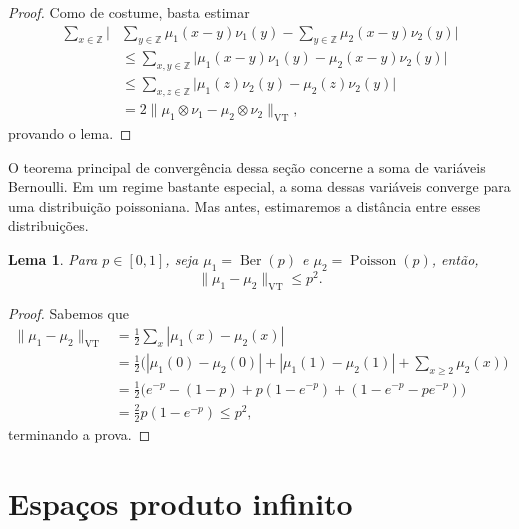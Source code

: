 \documentclass[reqno, draft]{book}
\newcommand*\1{\mathds{1}}
\newtheorem{lemma}[theorem]{Lema}
\DeclareMathOperator{\Poisson}{Poisson}
\DeclareMathOperator{\Ber}{Ber}
\DeclareMathOperator{\VT}{VT}
\begin{document}
\begin{proof}
Como de costume, basta estimar
\begin{equation}
  \begin{split}
    \sum_{x \in \mathbb{Z}} \Big| & \sum_{y \in \mathbb{Z}} \mu_1(x-y) \nu_1(y) - \sum_{y \in \mathbb{Z}} \mu_2(x-y)\nu_2(y) \Big|\\
    & \leq \sum_{x, y \in \mathbb{Z}} \big| \mu_1(x-y) \nu_1(y) - \mu_2(x-y)\nu_2(y) \big|\\
    & \leq \sum_{x, z \in \mathbb{Z}} \big| \mu_1(z) \nu_2(y) - \mu_2(z)\nu_2(y) \big|\\
    & = 2\lVert \mu_1 \otimes \nu_1 - \mu_2 \otimes \nu_2 \rVert_{\VT},
  \end{split}
\end{equation}
provando o lema.
\end{proof}

O teorema principal de convergência dessa seção concerne a soma de variáveis Bernoulli. Em um regime bastante especial, a soma dessas variáveis converge para uma distribuição poissoniana. Mas antes, estimaremos a distância entre esses distribuições.

\begin{lemma}
\label{l:vt_ber_poiss}
Para $p \in [0,1]$, seja $\mu_1 = \Ber(p)$ e $\mu_2 = \Poisson(p)$, então,
\begin{equation}
  \lVert \mu_1 - \mu_2 \rVert_{\VT} \leq p^2.
\end{equation}
\end{lemma}

\begin{proof}
Sabemos que
\begin{equation}
  \begin{split}
    \lVert \mu_1 - \mu_2 \rVert_{\VT} & = \frac{1}{2} \sum_{x} |\mu_1(x) - \mu_2(x)|\\
    & = \frac{1}{2} \Big( |\mu_1(0) - \mu_2(0)| + |\mu_1(1) - \mu_2(1)| + \sum_{x \geq 2} \mu_2(x) \Big)\\
    & = \frac{1}{2} \Big( e^{-p} - (1-p) + p(1-e^{-p}) + (1 - e^{-p} - p e^{-p}) \Big)\\
    & = \frac{2}{2} p (1 - e^{-p}) \leq p^2,
  \end{split}
\end{equation}
terminando a prova.
\end{proof}


\section{Espaços produto infinito}
\label{s:Omega_produto}
\end{document}
